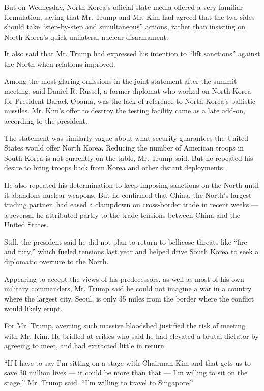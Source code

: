 But on Wednesday, North Korea's official state media offered a very
familiar formulation, saying that Mr. Trump and Mr. Kim had agreed that
the two sides should take ``step-by-step and simultaneous'' actions,
rather than insisting on North Korea's quick unilateral nuclear
disarmament.

It also said that Mr. Trump had expressed his intention to ``lift
sanctions'' against the North when relations improved.

Among the most glaring omissions in the joint statement after the summit
meeting, said Daniel R. Russel, a former diplomat who worked on North
Korea for President Barack Obama, was the lack of reference to North
Korea's ballistic missiles. Mr. Kim's offer to destroy the testing
facility came as a late add-on, according to the president.

The statement was similarly vague about what security guarantees the
United States would offer North Korea. Reducing the number of American
troops in South Korea is not currently on the table, Mr. Trump said. But
he repeated his desire to bring troops back from Korea and other distant
deployments.

He also repeated his determination to keep imposing sanctions on the
North until it abandons nuclear weapons. But he confirmed that China,
the North's largest trading partner, had eased a clampdown on
cross-border trade in recent weeks --- a reversal he attributed partly
to the trade tensions between China and the United States.

Still, the president said he did not plan to return to bellicose threats
like ``fire and fury,'' which fueled tensions last year and helped drive
South Korea to seek a diplomatic overture to the North.

Appearing to accept the views of his predecessors, as well as most of
his own military commanders, Mr. Trump said he could not imagine a war
in a country where the largest city, Seoul, is only 35 miles from the
border where the conflict would likely erupt.

For Mr. Trump, averting such massive bloodshed justified the risk of
meeting with Mr. Kim. He bridled at critics who said he had elevated a
brutal dictator by agreeing to meet, and had extracted little in return.

``If I have to say I'm sitting on a stage with Chairman Kim and that
gets us to save 30 million lives --- it could be more than that --- I'm
willing to sit on the stage,'' Mr. Trump said. ``I'm willing to travel
to Singapore.''

